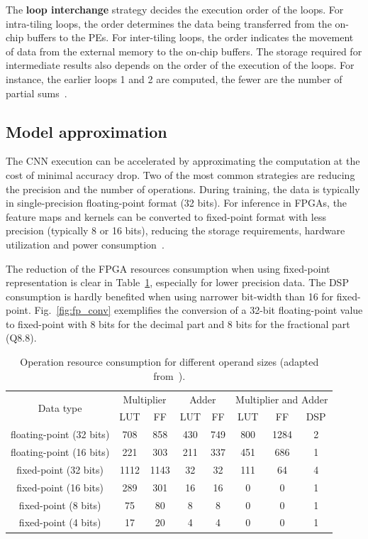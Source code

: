 The \textbf{loop interchange} strategy decides the execution order of the loops. For intra-tiling loops, the order determines the data being transferred from the on-chip buffers to the PEs. For inter-tiling loops, the order indicates the movement of data from the external memory to the on-chip buffers. The storage required for intermediate results also depends on the order of the execution of the loops. For instance, the earlier loops 1 and 2 are computed, the fewer are the number of partial sums~\cite{ma:loop_opt}. 

\subsection{Model approximation}

The CNN execution can be accelerated by approximating the computation at the cost of minimal accuracy drop. Two of the most common strategies are reducing the precision and the number of operations. During training, the data is typically in single-precision floating-point format (32 bits). For inference in FPGAs, the feature maps and kernels can be converted to fixed-point format with less precision (typically 8 or 16 bits), reducing the storage requirements, hardware utilization and power consumption~\cite{Abdelouahab:dnn_survey}. 

The reduction of the FPGA resources consumption when using fixed-point representation is clear in Table~\ref{tab:resource_cons}, especially for lower precision data. The DSP consumption is hardly benefited when using narrower bit-width than 16 for fixed-point. Fig.~\ref{fig:fp_conv} exemplifies the conversion of a 32-bit floating-point value to fixed-point with 8 bits for the decimal part and 8 bits for the fractional part (Q8.8).

\vspace{+0.1cm}
\begin{table}[!htb]
    \footnotesize
    \centering
    \caption{Operation resource consumption for different operand sizes (adapted from~\cite{Guo:dnn_survey}).}
    \label{tab:resource_cons}
    \begin{tabular}{|c|c c|c c|c c c|}
    \hline
   \multirow{2}{*}{Data type} & \multicolumn{2}{|c|}{Multiplier} & \multicolumn{2}{|c|}{Adder} & \multicolumn{3}{|c|}{Multiplier and Adder} \\ \cline{2-8}
                              & LUT & FF & LUT & FF & LUT & FF & DSP \\ \hline
   floating-point (32 bits)   & 708 & 858 & 430 & 749 & 800 & 1284 & 2 \\ \hline
   floating-point (16 bits)   & 221 & 303 & 211 & 337 & 451 & 686 & 1 \\ \hline
   fixed-point (32 bits)      & 1112 & 1143 & 32 & 32 & 111 & 64 & 4  \\ \hline
   fixed-point (16 bits)      & 289 & 301 & 16 & 16 & 0 & 0 & 1  \\ \hline
   fixed-point (8 bits)       & 75 & 80 & 8 & 8 & 0 & 0 & 1  \\ \hline
   fixed-point (4 bits)       & 17 & 20 & 4 & 4 & 0 & 0 & 1  \\ \hline
    \end{tabular}
\end{table}

